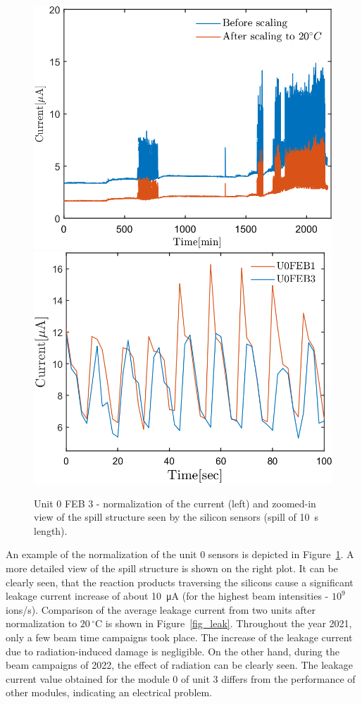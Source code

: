 \begin{figure}[!h]
\centering
\includegraphics[width=0.45\columnwidth]{Chapter6/DCS/images/uranium/current_U_highintensity.png}
\includegraphics[width=0.47\columnwidth]{Chapter6/DCS/images/uranium/U3L1_spill.png}
\caption{Unit 0 \gls{FEB} 3 - normalization of the current (left) and zoomed-in view of the spill structure seen by the silicon sensors (spill of 10~s length).}
\label{fig_sensors_spill}
\end{figure}

An example of the normalization of the unit 0 sensors is depicted in Figure~\ref{fig_sensors_spill}. A more detailed view of the spill structure is shown on the right plot. It can be clearly seen, that the reaction products traversing the silicons cause a significant leakage current increase of about \SI{10}{\micro A} (for the highest beam intensities - $10^{9}$ ions/s). Comparison of the average leakage current from two units after normalization to $20\,^{\circ}$C is shown in Figure~\ref{fig_leak}. Throughout the year 2021, only a few beam time campaigns took place. The increase of the leakage current due to radiation-induced damage is negligible. On the other hand, during the beam campaigns of 2022, the effect of radiation can be clearly seen. The leakage current value obtained for the module 0 of unit 3 differs from the performance of other modules, indicating an electrical problem.

